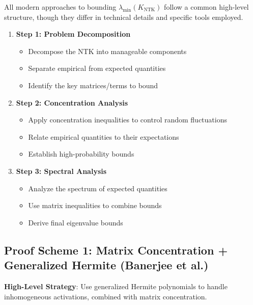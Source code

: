 \documentclass{article}
\newcommand{\KNTK}{K_{\text{NTK}}}
\newcommand{\lambdaMin}{\lambda_{\min}}
\begin{document}
All modern approaches to bounding $\lambdaMin(\KNTK)$ follow a common high-level structure, though they differ in technical details and specific tools employed.

\begin{enumerate}
    \item \textbf{Step 1: Problem Decomposition}
    \begin{itemize}
        \item Decompose the NTK into manageable components
        \item Separate empirical from expected quantities
        \item Identify the key matrices/terms to bound
    \end{itemize}
    
    \item \textbf{Step 2: Concentration Analysis}
    \begin{itemize}
        \item Apply concentration inequalities to control random fluctuations
        \item Relate empirical quantities to their expectations
        \item Establish high-probability bounds
    \end{itemize}
    
    \item \textbf{Step 3: Spectral Analysis}
    \begin{itemize}
        \item Analyze the spectrum of expected quantities
        \item Use matrix inequalities to combine bounds
        \item Derive final eigenvalue bounds
    \end{itemize}
\end{enumerate}

\subsection{Proof Scheme 1: Matrix Concentration + Generalized Hermite (Banerjee et al.)}

\textbf{High-Level Strategy}: Use generalized Hermite polynomials to handle inhomogeneous activations, combined with matrix concentration.
\end{document}
